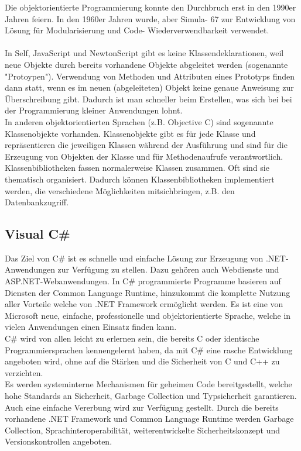 \documentclass[12pt,a4paper]{report}
\begin{document}
\begin{onehalfspace}
Die objektorientierte Programmierung konnte den Durchbruch erst in den 1990er Jahren feiern. In den 1960er Jahren wurde, aber Simula- 67 zur Entwicklung von Lösung für Modularisierung und Code- Wiederverwendbarkeit verwendet.\\
\\In Self, JavaScript und NewtonScript gibt es keine Klassendeklarationen, weil neue Objekte durch bereits vorhandene Objekte abgeleitet werden (sogenannte "{}Protoypen"{}). Verwendung von Methoden und Attributen eines Prototyps finden dann statt, wenn es im neuen (abgeleiteten) Objekt keine genaue Anweisung zur Überschreibung gibt. Dadurch ist man schneller beim Erstellen, was sich bei bei der Programmierung kleiner Anwendungen lohnt.\\

In anderen objektorientierten Sprachen (z.B. Objective C) sind sogenannte Klassenobjekte vorhanden. Klassenobjekte gibt es für jede Klasse und repräsentieren die jeweiligen Klassen während der Ausführung und sind für die Erzeugung von Objekten der Klasse und für Methodenaufrufe verantwortlich.\\

Klassenbibliotheken fassen normalerweise Klassen zusammen. Oft sind sie thematisch organisiert. Dadurch können Klassenbibliotheken implementiert werden, die verschiedene Möglichkeiten mitsichbringen, z.B. den Datenbankzugriff.

\subsection{Visual C\#}
Das Ziel von C\# ist es schnelle und einfache Lösung zur Erzeugung von .NET-Anwendungen zur Verfügung zu stellen. Dazu gehören auch Webdienste und ASP.NET-Webanwendungen. In C\# programmierte Programme basieren auf Diensten der Common Language Runtime, hinzukommt die komplette Nutzung aller Vorteile welche von .NET Framework ermöglicht werden. Es ist eine von Microsoft neue, einfache, professionelle und objektorientierte Sprache, welche in vielen Anwendungen einen Einsatz finden kann.\\

C\# wird von allen leicht zu erlernen sein, die bereits C oder identische Programmiersprachen kennengelernt haben, da mit C\# eine rasche Entwicklung angeboten wird, ohne auf die Stärken und die Sicherheit von C und C++ zu verzichten.\\

Es werden systeminterne Mechanismen für geheimen Code bereitgestellt, welche hohe Standards an Sicherheit, Garbage Collection und Typsicherheit garantieren.
\\Auch eine einfache Vererbung wird zur Verfügung gestellt. Durch die bereits vorhandene .NET Framework und Common Language Runtime werden Garbage Collection, Sprachinteroperabilität, weiterentwickelte Sicherheitskonzept und Versionskontrollen angeboten.


\end{onehalfspace}
\end{document}
